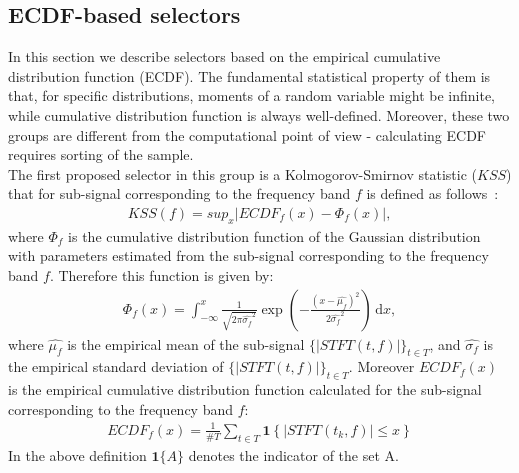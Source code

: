 \subsection{ECDF-based selectors}
In this section we describe selectors based on the empirical cumulative distribution function (ECDF). The fundamental statistical property of them is that, for specific distributions, moments of a random variable might be infinite, while cumulative distribution function is always well-defined. Moreover, these two groups are different from the computational point of view - calculating ECDF requires sorting of the sample.\\
The first proposed selector in this group is a Kolmogorov-Smirnov  statistic ($KSS$) that for sub-signal corresponding to the frequency band $f$ is defined as follows~\cite{Corder2009,Justel1997251}:
\begin{eqnarray}\label{selection_K-S}
KSS(f)=sup_x\left|ECDF_f(x)-\Phi_f(x)\right|,
\end{eqnarray}
where $\Phi_f$ is the cumulative distribution function of the Gaussian distribution with parameters estimated from the sub-signal corresponding to the frequency band $f$. Therefore this function is given by:
\begin{eqnarray}\label{selection_FF}\Phi_f(x)=\int^{x}_{-\infty} \! \frac{1}{\sqrt{2\pi\widehat{\sigma_f}^2}}\exp \left( -\frac{\left(x-\widehat{\mu_f}\right)^2}{2\widehat{\sigma_f}^2} \right) \, \mathrm{d} x,\end{eqnarray}
where $\widehat{\mu_f}$ is the empirical mean of the sub-signal $\{|STFT(t,f)|\}_{t\in T}$, and $\widehat{\sigma_f}$ is the empirical standard deviation of  $\{|STFT(t,f)|\}_{t\in T}$. Moreover $ECDF_f(x)$ is the empirical cumulative distribution function calculated for the sub-signal corresponding to the frequency band $f$:
\begin{eqnarray}\label{selection_ECDF}
ECDF_f(x)=\frac{1}{\#T}\sum_{t\in T}\mathbf{1}\left\{ |STFT(t_k,f)|\leq x\right\}
\end{eqnarray}
In the above definition $\mathbf{1}\{A\}$ denotes the indicator of the set A.\\
